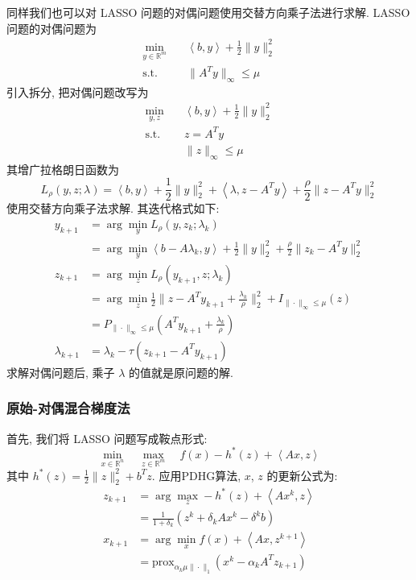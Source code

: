 \documentclass{article}
\begin{document}
同样我们也可以对 LASSO 问题的对偶问题使用交替方向乘子法进行求解. LASSO 问题的对偶问题为
\begin{equation*}
    \begin{aligned}
        \min_{y\in \mathbb{R}^m}\quad &\left<b, y\right> + \frac{1}{2} \|y\|_2^2
        \\
        \text{s.t.}\quad & \|A^T y\|_{\infty} \leq \mu
    \end{aligned}
\end{equation*}
引入拆分, 把对偶问题改写为
\begin{equation*}
    \begin{aligned}
        \min_{y, z}\quad &\left<b, y\right> + \frac{1}{2} \|y\|_2^2
        \\
        \text{s.t.}\quad & z = A^T y\\
        & \|z\|_{\infty} \leq \mu
    \end{aligned}
\end{equation*}
其增广拉格朗日函数为
\begin{equation*}
    L_\rho(y, z; \lambda) = \left<b, y\right> + \frac{1}{2} \|y\|_2^2 + \left<\lambda, z - A^T y\right> + \frac{\rho}{2}\|z - A^T y\|_2^2
\end{equation*}
使用交替方向乘子法求解. 其迭代格式如下:
\begin{align*}
    y_{k+1} &= \arg \min_{y} L_\rho(y, z_k; \lambda_k)\\
    & = \arg \min_{y} \left<b-A\lambda_k, y\right> + \frac{1}{2} \|y\|_2^2  + \frac{\rho}{2}\|z_k - A^T y\|_2^2\\
    z_{k+1} &= \arg \min_{z} L_\rho(y_{k+1}, z; \lambda_k)\\
    & = \arg \min_{z} \frac{1}{2}\|z - A^T y_{k+1} + \frac{\lambda_k}{\rho}\|_2^2 + I_{\|\cdot\|_{\infty} \leq \mu}(z)\\
    & = P_{\|\cdot\|_{\infty} \leq \mu}(A^T y_{k+1} + \frac{\lambda_k}{\rho})\\
    \lambda_{k+1} &= \lambda_k - \tau(z_{k+1} - A^T y_{k+1})
\end{align*}
求解对偶问题后, 乘子 $\lambda$ 的值就是原问题的解.

\subsubsection{原始-对偶混合梯度法}

首先, 我们将 LASSO 问题写成鞍点形式:
\begin{equation*}
    \min_{x \in \mathbb{R}^n}\quad \max_{z \in \mathbb{R}^m}\quad f(x) - h^*(z) + \left<Ax, z\right>
\end{equation*}
其中 $h^*(z) = \frac{1}{2}\|z\|_2^2 + b^T z$. 应用PDHG算法, $x$, $z$ 的更新公式为:
\begin{align*}
    z_{k+1} &=\arg \max_{z} - h^*(z) + \left<Ax^k, z\right>\\
    &= \frac{1}{1+\delta_k}(z^k + \delta_k A x^k - \delta^k b)\\
    x_{k+1} &= \arg \min_x f(x) + \left<Ax, z^{k+1}\right>\\
    &= \text{prox}_{\alpha_k\mu\|\cdot\|_1}(x^k - \alpha_k A^T z_{k+1})\\
\end{align*}
\end{document}
